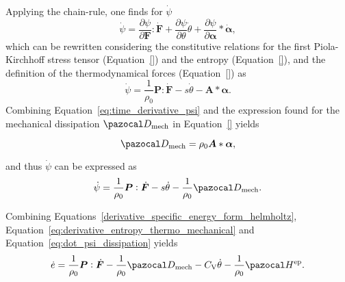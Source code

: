 Applying the chain-rule, one finds for \(\dot\psi\)
\begin{equation}
  \dot \psi = \frac{\partial \psi}{\partial \bm F}:\dot{\bm F} + \frac{\partial \psi}{\partial \theta}\dot\theta + \frac{\partial \psi}{\partial \bm \alpha}*\dot{\bm \alpha},
\end{equation}
which can be rewritten considering the constitutive relations for the first Piola-Kirchhoff stress tensor (Equation~\eqref{}) and the entropy (Equation~\eqref{}), and the definition of the thermodynamical forces (Equation~\eqref{}) as
\begin{equation} \label{eq:time_derivative_psi}
  \dot \psi = \frac{1}{\rho_0} \bm P:\dot{\bm F} -s\dot{\theta} - \bm A*\bm \alpha.
\end{equation}
Combining Equation~\eqref{eq:time_derivative_psi} and the expression found for the mechanical dissipation \(\pazocal D_\text{mech}\) in Equation~\eqref{} yields
\begin{highlight}
  \begin{equation}
    \pazocal D_\text{mech} = \rho_0\bm A *\bm \alpha,
  \end{equation}
\end{highlight}
and thus \(\dot\psi\) can be expressed as
\begin{equation} \label{eq:dot_psi_dissipation}
  \dot \psi = \frac{1}{\rho_0} \bm P:\dot{\bm F} -s\dot{\theta} -\frac{1}{\rho_0}\pazocal D_\text{mech}.
\end{equation}

Combining Equations~\eqref{derivative_specific_energy_form_helmholtz}, Equation~\eqref{eq:derivative_entropy_thermo_mechanical} and Equation~\eqref{eq:dot_psi_dissipation} yields
\begin{equation}
  \dot e = \frac{1}{\rho_0}\bm P:\dot{\bm F} - \frac{1}{\rho_0}\pazocal D_\text{mech} - C_\mathrm{V}\dot \theta - \frac{1}{\rho_0}\pazocal H^\text{ep}.
\end{equation}

